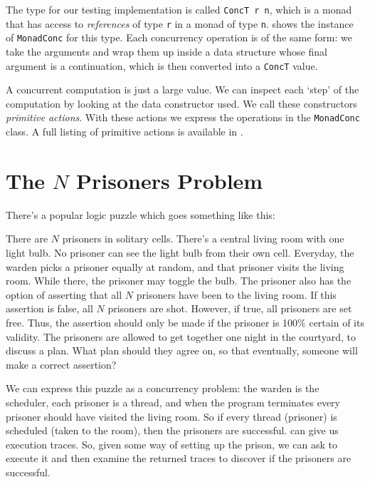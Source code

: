 The type for our testing implementation is called \verb|ConcT r n|, which is a
monad that has access to \emph{references} of type \verb|r| in a monad of type
\verb|n|.   shows the instance of \verb|MonadConc| for
this type.  Each concurrency operation is of the same form: we take the
arguments and wrap them up inside a data structure whose final argument is a
continuation, which is then converted into a \verb|ConcT| value.

A concurrent computation is just a large value.  We can inspect each
`step' of the computation by looking at the data constructor used.  We
call these constructors \emph{primitive actions}.  With these actions
we express the operations in the \verb|MonadConc| class.  A full
listing of primitive actions is available in .

\section{The $N$ Prisoners Problem}
\label{sec:dejafu-100}

There's a popular logic puzzle which goes something like this:

\begin{displayquote}
  There are $N$ prisoners in solitary cells.  There's a central living
  room with one light bulb.  No prisoner can see the light bulb from
  their own cell.  Everyday, the warden picks a prisoner equally at
  random, and that prisoner visits the living room.  While there, the
  prisoner may toggle the bulb.  The prisoner also has the option of
  asserting that all $N$ prisoners have been to the living room.  If
  this assertion is false, all $N$ prisoners are shot.  However, if
  true, all prisoners are set free.  Thus, the assertion should only
  be made if the prisoner is 100\% certain of its validity.  The
  prisoners are allowed to get together one night in the courtyard, to
  discuss a plan.  What plan should they agree on, so that eventually,
  someone will make a correct assertion?
\end{displayquote}

We can express this puzzle as a concurrency problem: the warden is the
scheduler, each prisoner is a thread, and when the program terminates
every prisoner should have visited the living room.  So if every
thread (prisoner) is scheduled (taken to the room), then the prisoners
are successful.  \dejafu{} can give us execution traces.  So, given
some way of setting up the prison, we can ask \dejafu{} to execute it
and then examine the returned traces to discover if the prisoners are
successful.


